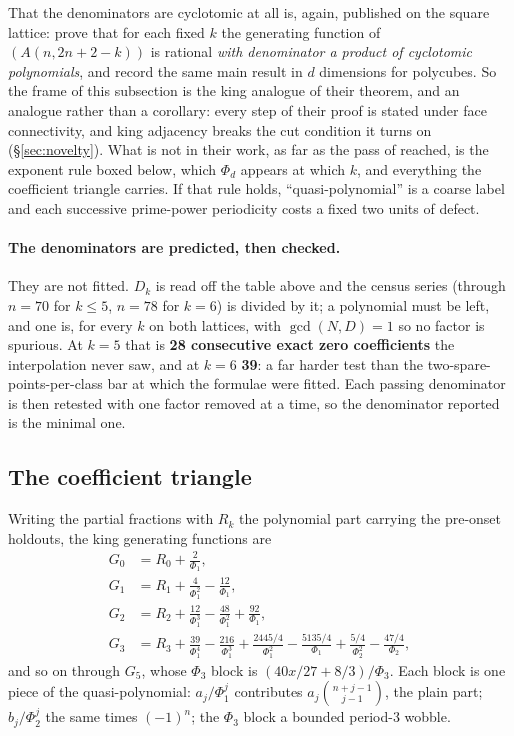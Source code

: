 \documentclass[11pt]{article}
\newcommand{\Phid}{\Phi}
\begin{document}
That the denominators are cyclotomic at all is, again, published on the square
lattice: \cite{abz2018} prove that for each fixed $k$ the generating function
of $(A(n, 2n+2-k))$ is rational \emph{with denominator a product of cyclotomic
polynomials}, and record the same main result in $d$ dimensions for polycubes.
So the frame of this subsection is the king analogue of their theorem, and an
analogue rather than a corollary: every step of their proof is stated under face
connectivity, and king adjacency breaks the cut condition it turns on
(\S\ref{sec:novelty}). What is not in their work, as far as the pass of
 reached, is the exponent rule boxed
below, which $\Phid_d$ appears at which $k$, and everything the
coefficient triangle carries. If that rule holds, ``quasi-polynomial'' is a
coarse label and each successive prime-power periodicity costs a fixed two
units of defect.

\paragraph{The denominators are predicted, then checked.} They are not fitted.
$D_k$ is read off the table above and the census series (through $n = 70$ for
$k \le 5$, $n = 78$ for $k = 6$) is divided by it; a polynomial must be left,
and one is, for every $k$ on both lattices, with $\gcd(N,D) = 1$ so no factor is
spurious. At $k = 5$ that is \textbf{28 consecutive exact zero coefficients} the
interpolation never saw, and at $k = 6$ \textbf{39}: a far harder test than the
two-spare-points-per-class bar at which the formulae were fitted. Each passing
denominator is then retested with one factor removed at a time, so the
denominator reported is the minimal one.

\subsection{The coefficient triangle}
\label{sec:coefftri}

Writing the partial fractions with $R_k$ the polynomial part carrying the
pre-onset holdouts, the king generating functions are
\[
\begin{aligned}
  G_0 &= R_0 + \tfrac{2}{\Phid_1}, \\
  G_1 &= R_1 + \tfrac{4}{\Phid_1^2} - \tfrac{12}{\Phid_1}, \\
  G_2 &= R_2 + \tfrac{12}{\Phid_1^3} - \tfrac{48}{\Phid_1^2} + \tfrac{92}{\Phid_1}, \\
  G_3 &= R_3 + \tfrac{39}{\Phid_1^4} - \tfrac{216}{\Phid_1^3}
        + \tfrac{2445/4}{\Phid_1^2} - \tfrac{5135/4}{\Phid_1}
        + \tfrac{5/4}{\Phid_2^2} - \tfrac{47/4}{\Phid_2},
\end{aligned}
\]
and so on through $G_5$, whose $\Phid_3$ block is $(40x/27 + 8/3)/\Phid_3$. Each
block is one piece of the quasi-polynomial: $a_j/\Phid_1^j$ contributes
$a_j\binom{n+j-1}{j-1}$, the plain part; $b_j/\Phid_2^j$ the same times
$(-1)^n$; the $\Phid_3$ block a bounded period-3 wobble.
\end{document}
